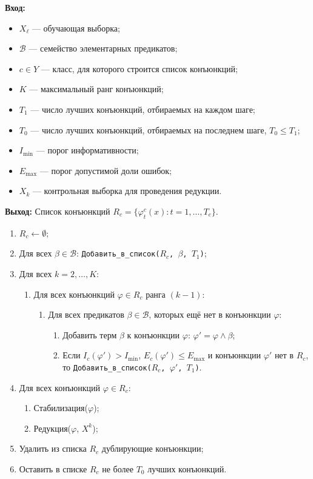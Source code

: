 \textbf{Вход:}
\begin{itemize}
    \item $X_\ell$ --- обучающая выборка;
    \item $\mathcal{B}$ --- семейство элементарных предикатов;
    \item $c \in Y$ --- класс, для которого строится список конъюнкций;
    \item $K$ --- максимальный ранг конъюнкций;
    \item $T_1$ --- число лучших конъюнкций, отбираемых на каждом шаге;
    \item $T_0$ --- число лучших конъюнкций, отбираемых на последнем шаге, $T_0 \leq T_1$;
    \item $I_{\min}$ --- порог информативности;
    \item $E_{\max}$ --- порог допустимой доли ошибок;
    \item $X_k$ --- контрольная выборка для проведения редукции.
\end{itemize}

\textbf{Выход:} Список конъюнкций $R_c = \{\varphi_t^c(x) : t = 1, \dots, T_c\}$.

\begin{enumerate}
    \item $R_c \gets \emptyset$;
    \item Для всех $\beta \in \mathcal{B}$: \texttt{Добавить\_в\_список($R_c$, $\beta$, $T_1$)};
    \item Для всех $k = 2, \dots, K$:
          \begin{enumerate}
              \item Для всех конъюнкций $\varphi \in R_c$ ранга $(k-1)$:
                    \begin{enumerate}
                        \item Для всех предикатов $\beta \in \mathcal{B}$, которых ещё нет в конъюнкции $\varphi$:
                              \begin{enumerate}
                                  \item Добавить терм $\beta$ к конъюнкции $\varphi$: $\varphi' = \varphi \land \beta$;
                                  \item Если $I_c(\varphi') > I_{\min}$, $E_c(\varphi') \leq E_{\max}$ и конъюнкции $\varphi'$ нет в $R_c$, то \texttt{Добавить\_в\_список($R_c$, $\varphi'$, $T_1$)}.
                              \end{enumerate}
                    \end{enumerate}
          \end{enumerate}
    \item Для всех конъюнкций $\varphi \in R_c$:
          \begin{enumerate}
              \item Стабилизация($\varphi$);
              \item Редукция($\varphi$, $X^k$);
          \end{enumerate}
    \item Удалить из списка $R_c$ дублирующие конъюнкции;
    \item Оставить в списке $R_c$ не более $T_0$ лучших конъюнкций.
\end{enumerate}


